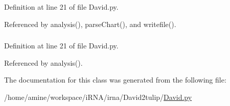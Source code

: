 \-Definition at line 21 of file \-David.\-py.



\-Referenced by analysis(), parse\-Chart(), and writefile().

\hypertarget{classirna_1_1David2tulip_1_1David_1_1David_a0af6278779af6f673431f1a10a5be0ab}{
\subsubsection[{list\-Type}]{}}
\label{classirna_1_1David2tulip_1_1David_1_1David_a0af6278779af6f673431f1a10a5be0ab}


\-Definition at line 21 of file \-David.\-py.



\-Referenced by analysis().



\-The documentation for this class was generated from the following file\-:\begin{DoxyCompactItemize}
\item 
/home/amine/workspace/i\-R\-N\-A/irna/\-David2tulip/\hyperlink{David_8py}{\-David.\-py}\end{DoxyCompactItemize}
